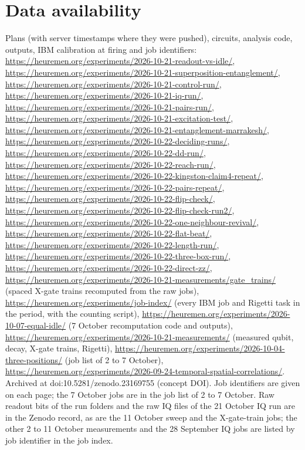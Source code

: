 \documentclass[reprint,amsmath,amssymb,aps,superscriptaddress,nofootinbib]{revtex4-2}
\begin{document}
\section{Data availability}

Plans (with server timestamps where they were pushed), circuits, analysis code, outputs, IBM calibration at firing and job identifiers: \url{https://heuremen.org/experiments/2026-10-21-readout-vs-idle/}, \url{https://heuremen.org/experiments/2026-10-21-superposition-entanglement/}, \url{https://heuremen.org/experiments/2026-10-21-control-run/}, \url{https://heuremen.org/experiments/2026-10-21-iq-run/}, \url{https://heuremen.org/experiments/2026-10-21-pairs-run/}, \url{https://heuremen.org/experiments/2026-10-21-excitation-test/}, \url{https://heuremen.org/experiments/2026-10-21-entanglement-marrakesh/}, \url{https://heuremen.org/experiments/2026-10-22-deciding-runs/}, \url{https://heuremen.org/experiments/2026-10-22-dd-run/}, \url{https://heuremen.org/experiments/2026-10-22-reach-run/}, \url{https://heuremen.org/experiments/2026-10-22-kingston-claim4-repeat/}, \url{https://heuremen.org/experiments/2026-10-22-pairs-repeat/}, \url{https://heuremen.org/experiments/2026-10-22-flip-check/}, \url{https://heuremen.org/experiments/2026-10-22-flip-check-run2/}, \url{https://heuremen.org/experiments/2026-10-22-one-neighbour-revival/}, \url{https://heuremen.org/experiments/2026-10-22-flat-beat/}, \url{https://heuremen.org/experiments/2026-10-22-length-run/}, \url{https://heuremen.org/experiments/2026-10-22-three-box-run/}, \url{https://heuremen.org/experiments/2026-10-22-direct-zz/}, \url{https://heuremen.org/experiments/2026-10-21-measurements/gate_trains/} (spaced X-gate trains recomputed from the raw jobs), \url{https://heuremen.org/experiments/job-index/} (every IBM job and Rigetti task in the period, with the counting script), \url{https://heuremen.org/experiments/2026-10-07-equal-idle/} (7 October recomputation code and outputs), \url{https://heuremen.org/experiments/2026-10-21-measurements/} (measured qubit, decay, X-gate trains, Rigetti), \url{https://heuremen.org/experiments/2026-10-04-three-positions/} (job list of 2 to 7 October), \url{https://heuremen.org/experiments/2026-09-24-temporal-spatial-correlations/}. Archived at doi:10.5281/zenodo.23169755 (concept DOI). Job identifiers are given on each page; the 7 October jobs are in the job list of 2 to 7 October. Raw readout bits of the run folders and the raw IQ files of the 21 October IQ run are in the Zenodo record, as are the 11 October sweep and the X-gate-train jobs; the other 2 to 11 October measurements and the 28 September IQ jobs are listed by job identifier in the job index.
\end{document}
